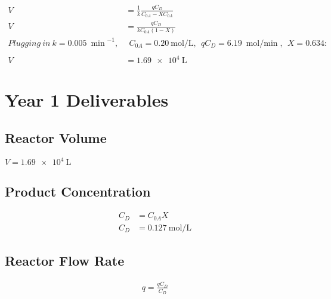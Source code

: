 \documentclass[letterpaper, 12pt]{article}
\begin{document}
\begin{align*}
	V &= \frac{1}{k}\frac{qC_D}{C_{0A} - XC_{0A}} \\
	V &= \frac{qC_D}{kC_{0A}(1 - X)} \\
	Plugging\ in\ k = \SI{0.005}{\min}^{-1},&\ \
	C_{0A} = \SI{0.20}{\mole\per\liter},\ \
	qC_D = \SI{6.19}{\mole\per\min},\ \
	X = 0.634: \\
	\\
	V &= \SI{1.69e4}{\liter}
\end{align*}
\section{Year 1 Deliverables}
\subsection{Reactor Volume}
$V = \SI{1.69e4}{\liter}$
\subsection{Product Concentration}
\begin{align*}
	C_D &= C_{0A}X \\
	C_D &= \SI{0.127}{\mole\per\liter}
\end{align*}
\subsection{Reactor Flow Rate}
\begin{align*}
	q = \frac{qC_D}{C_D}
\end{align*}
\end{document}
